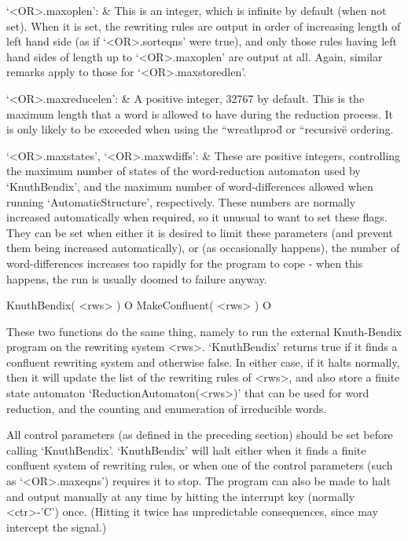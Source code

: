 `<OR>.maxoplen': &
	This is an  integer, which is  infinite  by default (when  not
	set).  When it is set, the rewriting rules are output in order
	of increasing length of left hand side (as if `<OR>.sorteqns'
	were true), and only  those  rules having  left hand sides  of
	length up to     `<OR>.maxoplen' are output   at all.  Again,
	similar remarks apply to those for `<OR>.maxstoredlen'.

`<OR>.maxreducelen': &
	A positive integer,  32767  by default.  This is  the  maximum
	length that a word is   allowed to have during the   reduction
	process.  It is  only likely to  be   exceeded when using  the
	{``wreathprod\"} or {``recursive\"} ordering.

`<OR>.maxstates', `<OR>.maxwdiffs': &
	These are positive integers, controlling the maximum number of
	states of the word-reduction  automaton used by `KnuthBendix',  and the
	maximum  number   of  word-differences allowed   when  running
	`AutomaticStructure', respectively. These numbers are normally increased
	automatically   when required, so it   unusual to  want to set
	these  flags. They can   be set when  either  it is desired to
	limit these parameters   (and  prevent them   being  increased
	automatically), or (as   occasionally happens), the number  of
	word-differences increases too rapidly for the program to cope
	-   when this happens, the  run  is usually  doomed to failure
	anyway.
\enditems



\>KnuthBendix( <rws> ) O
\>MakeConfluent( <rws> ) O

These two functions do the same thing, namely to
run the external Knuth-Bendix program  on the rewriting system  <rws>.
`KnuthBendix'  returns  true  if it  finds   a  confluent rewriting system  and
otherwise false. In either case,  if it halts  normally, then it  will
update the list
of the rewriting rules of <rws>, and also store a  finite state automaton
`ReductionAutomaton(<rws>)' that  can be  used for  word reduction,  and  the
counting and enumeration of irreducible words.

All control parameters (as defined in the preceding section) should be
set  before calling `KnuthBendix'.  `KnuthBendix'  will halt either when it
finds a finite confluent system of rewriting rules, or when one of the
control parameters (such as `<OR>.maxeqns') requires it to stop.  The
program can also  be made to halt and  output manually at any time  by
hitting the interrupt key (normally <ctr>-'C') once. (Hitting it twice
has   unpredictable   consequences, since  {\GAP}    may intercept the
signal.)
	
